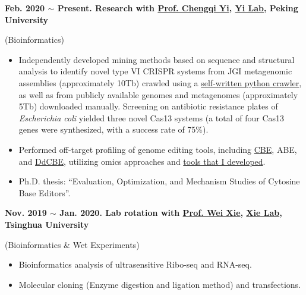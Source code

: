 \textbf{
    Feb. 2020 $\sim$ Present. Research with \href{https://www.bio.pku.edu.cn/enhomes/news/teacher_dis/91.html}{Prof. Chengqi Yi}, \href{https://yilab.org.cn/}{Yi Lab}, Peking University
}

(Bioinformatics)

\begin{itemize}
    \item Independently developed mining methods based on sequence and structural analysis to 
    identify novel type VI CRISPR systems from 
    JGI metagenomic assemblies (approximately 10Tb) crawled using a 
    \href{https://github.com/hermanzhaozzzz/bioat/blob/master/src/bioat/metatools.py}{self-written python crawler}, 
    as well as from publicly available genomes and metagenomes (approximately 5Tb) downloaded manually.
    Screening on antibiotic resistance plates of \textit{Escherichia coli} 
    yielded three novel Cas13 systems (a total of four Cas13 genes were synthesized, 
    with a success rate of 75\%).

    \item Performed off-target profiling of genome editing tools, including 
    \href{https://scholar.google.com/citations?view_op=view_citation&hl=zh-CN&user=ojSVoWQAAAAJ&citation_for_view=ojSVoWQAAAAJ:zYLM7Y9cAGgC}{CBE}, 
    ABE, 
    and \href{https://scholar.google.com/citations?view_op=view_citation&hl=zh-CN&user=ojSVoWQAAAAJ&citation_for_view=ojSVoWQAAAAJ:Y0pCki6q_DkC}{DdCBE}, 
    utilizing omics approaches 
    and \href{https://github.com/hermanzhaozzzz?tab=repositories&q=snakepipes&type=&language=&sort=}
    {tools that I developed}.
    \item Ph.D. thesis: ``Evaluation, Optimization, and Mechanism Studies of Cytosine Base Editors''.
    
\end{itemize}

\textbf{
    Nov. 2019 $\sim$ Jan. 2020. Lab rotation with \href{https://life.tsinghua.edu.cn/lifeen/info/1034/1077.htm}{Prof. Wei Xie}, \href{http://www.xielab.org.cn/}{Xie Lab}, Tsinghua University
}

(Bioinformatics \& Wet Experiments)

\begin{itemize}
    \item Bioinformatics analysis of ultrasensitive Ribo-seq and RNA-seq.
    \item Molecular cloning (Enzyme digestion and ligation method) and transfections.
\end{itemize}

